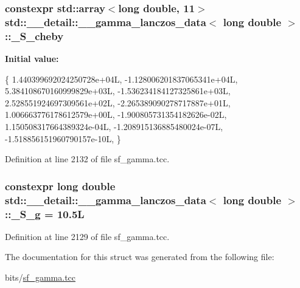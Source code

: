 \subsubsection[{\texorpdfstring{\+\_\+\+S\+\_\+cheby}{_S_cheby}}]{\setlength{\rightskip}{0pt plus 5cm}constexpr std\+::array$<$long double, 11$>$ {\bf std\+::\+\_\+\+\_\+detail\+::\+\_\+\+\_\+gamma\+\_\+lanczos\+\_\+data}$<$ long double $>$\+::\+\_\+\+S\+\_\+cheby\hspace{0.3cm}{\ttfamily [static]}}\hypertarget{structstd_1_1____detail_1_1____gamma__lanczos__data_3_01long_01double_01_4_a7968f4e72045e6a2b09244c678ddf3cc}{}\label{structstd_1_1____detail_1_1____gamma__lanczos__data_3_01long_01double_01_4_a7968f4e72045e6a2b09244c678ddf3cc}
{\bfseries Initial value\+:}
\begin{DoxyCode}
\{
     1.440399692024250728e+04L,
    -1.128006201837065341e+04L,
     5.384108670160999829e+03L,
    -1.536234184127325861e+03L,
     2.528551924697309561e+02L,
    -2.265389090278717887e+01L,
     1.006663776178612579e+00L,
    -1.900805731354182626e-02L,
     1.150508317664389324e-04L,
    -1.208915136885480024e-07L,
    -1.518856151960790157e-10L,
      \}
\end{DoxyCode}


Definition at line 2132 of file sf\+\_\+gamma.\+tcc.

\subsubsection[{\texorpdfstring{\+\_\+\+S\+\_\+g}{_S_g}}]{\setlength{\rightskip}{0pt plus 5cm}constexpr long double {\bf std\+::\+\_\+\+\_\+detail\+::\+\_\+\+\_\+gamma\+\_\+lanczos\+\_\+data}$<$ long double $>$\+::\+\_\+\+S\+\_\+g = 10.\+5L\hspace{0.3cm}{\ttfamily [static]}}\hypertarget{structstd_1_1____detail_1_1____gamma__lanczos__data_3_01long_01double_01_4_af86428283206e8b9bd3dc5709855c901}{}\label{structstd_1_1____detail_1_1____gamma__lanczos__data_3_01long_01double_01_4_af86428283206e8b9bd3dc5709855c901}


Definition at line 2129 of file sf\+\_\+gamma.\+tcc.



The documentation for this struct was generated from the following file\+:\begin{DoxyCompactItemize}
\item 
bits/\hyperlink{sf__gamma_8tcc}{sf\+\_\+gamma.\+tcc}\end{DoxyCompactItemize}

